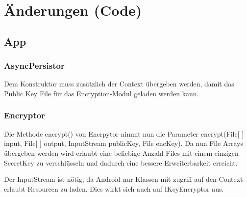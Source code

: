 \chapter{Änderungen (Code)} \label{chap:AenderungenCode}

\section{App}

\subsection{AsyncPersistor}
Dem Konstruktor muss zusätzlich der Context übergeben werden, damit das Public Key File für das Encryption-Modul geladen werden kann.

\subsection{Encryptor}
Die Methode encrypt() von Encrpytor nimmt nun die Parameter encrypt(File[ ] input, File[ ] output, InputStream publicKey, File encKey). Da nun File Arrays übergeben werden wird erlaubt eine beliebige Anzahl Files mit einem einzigen SecretKey zu verschlüsseln und dadurch eine bessere Erweiterbarkeit erreicht. \par   
Der InputStream ist nötig, da Android nur Klassen mit zugriff auf den Context erlaubt Resourcen zu laden. Dies wirkt sich auch auf IKeyEncryptor aus.

